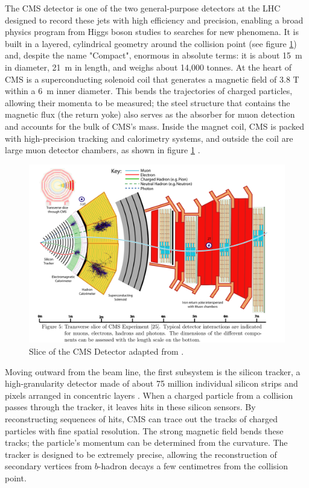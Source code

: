 The CMS detector is one of the two general-purpose detectors at the LHC designed to record these jets with high efficiency and precision, enabling a broad physics program from Higgs boson studies to searches for new phenomena. It is built in a layered, cylindrical geometry around the collision point (see figure \ref{fig:cms_overview}) and, despite the name "Compact", enormous in absolute terms: it is about 15~m in diameter, 21~m in length, and weighs about 14,000 tonnes. At the heart of CMS is a superconducting solenoid coil that generates a magnetic field of 3.8 T within a 6~m inner diameter. This bends the trajectories of charged particles, allowing their momenta to be measured; the steel structure that contains the magnetic flux (the return yoke) also serves as the absorber for muon detection and accounts for the bulk of CMS’s mass. Inside the magnet coil, CMS is packed with high-precision tracking and calorimetry systems, and outside the coil are large muon detector chambers, as shown in figure \ref{fig:cms_overview} \cite{CMS}.

\begin{figure}[h]
\centering
    \includegraphics[width=15cm]{media/cms_cutview.png}
    \caption{Slice of the CMS Detector adapted from \cite{Sirunyan_2017}.}
    \label{fig:cms_overview}
\end{figure}
\newpage
Moving outward from the beam line, the first subsystem is the silicon tracker, a high-granularity detector made of about 75 million individual silicon strips and pixels arranged in concentric layers \cite{CMS}. When a charged particle from a collision passes through the tracker, it leaves hits in these silicon sensors. By reconstructing sequences of hits, CMS can trace out the tracks of charged particles with fine spatial resolution. The strong magnetic field bends these tracks; the particle’s momentum can be determined from the curvature. The tracker is designed to be extremely precise, allowing the reconstruction of secondary vertices from $b$-hadron decays a few centimetres from the collision point.

